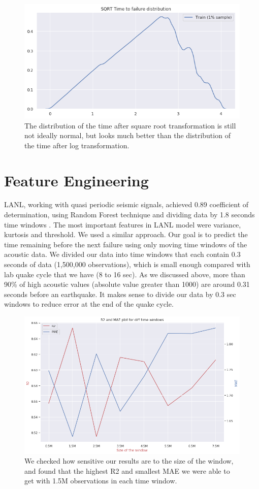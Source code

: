 \documentclass[]{llncs} %
\begin{document}
\begin{figure}
	\centering
	\includegraphics[width=.9\linewidth]{sqrtTimeToFailureDistribution}
	\caption{The distribution of the time after square root transformation is still not ideally normal, but looks much better than the distribution of the time after log transformation.}
	\label{fig:sqrtTimeToFailureDistribution}
\end{figure}
\clearpage
\newpage
\section{Feature Engineering}
LANL, working with quasi periodic seismic signals, achieved 0.89 coefficient of determination, using Random Forest technique and dividing data by 1.8 seconds time windows \cite{Bertrand}.  The most important features in LANL model were variance, kurtosis and threshold. We used a similar approach. Our goal is to predict the time remaining before the next failure using only moving time windows of the acoustic data. We divided our data into time windows that each contain 0.3 seconds of data (1,500,000 observations), which is small enough compared with lab quake cycle that we have (8 to 16 sec). As we discussed above, more than 90\% of high acoustic values (absolute value greater than 1000) are around 0.31 seconds before an earthquake. It makes sense to divide our data by 0.3 sec windows to reduce error at the end of the quake cycle. 

\begin{figure}
	\centering
	\includegraphics[width=.9\linewidth]{rSquaredandMAE}
	\caption{We checked how sensitive our results are to the size of the window, and found that the highest R2 and smallest MAE we were able to get with 1.5M observations in each time window.}
	\label{fig:rSquaredandMAE}
\end{figure}
\end{document}
